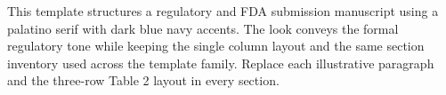 
This template structures a regulatory and FDA submission manuscript using a palatino serif with dark blue navy accents. The look conveys the formal regulatory tone while keeping the single column layout and the same section inventory used across the template family. Replace each illustrative paragraph and the three-row Table 2 layout in every section.
